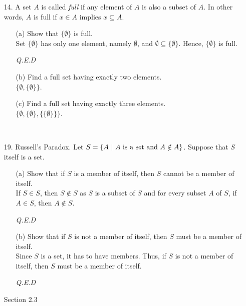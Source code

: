 \documentclass[12pt, a4paper]{article}                  %
\begin{document}
\begin{enumerate}
\item[14.]
A set $A$ is called \textit{full} if any element of $A$ is also a subset of $A$.
In other words, $A$ is full if $x \in A$ implies $x \subseteq A$.
\begin{enumerate}
\item[(a)]
Show that $\{\emptyset\}$ is full.\\

Set $\{\emptyset\}$ has only one element, namely $\emptyset$, and $\emptyset \subseteq \{\emptyset\}$.
Hence, $\{\emptyset\}$ is full.
\begin{flushright}
\textit{Q.E.D}
\end{flushright}
\item[(b)]
Find a full set having exactly two elements.\\

$\{\emptyset,\{\emptyset\}\}$.
\\
\item[(c)]
Find a full set having exactly three elements.\\

$\{\emptyset,\{\emptyset\},\{\{\emptyset\}\}\}$.
\end{enumerate}

\

\item[19.]
Russell's Paradox. Let $S = \{A \ \vert \ A \ \textnormal{is a set and} \ A \notin A\}$.
Suppose that $S$ itself is a set.
\begin{enumerate}
\item[(a)]
Show that if $S$ is a member of itself, then $S$ cannot be a member of itself.\\

If $S \in S$, then $S \notin S$ as $S$ is a subset of $S$ and for every subset $A$
of $S$, if $A \in S$, then $A \notin S$.
\begin{flushright}
\textit{Q.E.D}
\end{flushright}
\item[(b)]
Show that if $S$ is not a member of itself, then $S$ must be a member of itself.\\

Since $S$ is a set, it has to have members.
Thus, if $S$ is not a member of itself, then $S$ must be a member of itself.
\begin{flushright}
\textit{Q.E.D}
\end{flushright}
\end{enumerate}

{\large Section 2.3}
\\


\end{enumerate}
\end{document}
